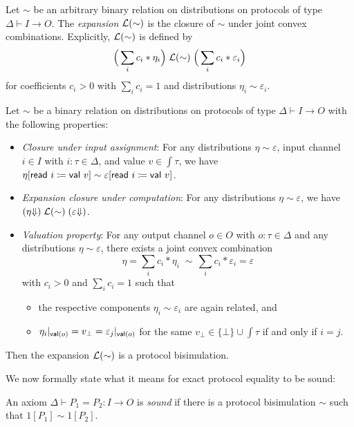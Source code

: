 \begin{definition}
Let $\sim$ be an arbitrary binary relation on distributions on protocols of type $\Delta \vdash I \to O$. The \emph{expansion} $\mathcal{L}(\sim)$ is the closure of $\sim$ under joint convex combinations. Explicitly, $\mathcal{L}(\sim)$ is defined by
\[\Big(\sum_i c_i * \eta_i\Big) \; \mathcal{L}(\sim) \; \Big(\sum_i c_i * \varepsilon_i\Big)\]
for coefficients $c_i > 0$ with $\sum_i c_i = 1$ and distributions $\eta_i \sim \varepsilon_i$.
\end{definition}

\begin{lemma}\label{lem:protocol_seed}
Let $\sim$ be a binary relation on distributions on protocols of type $\Delta \vdash I \to O$ with the following properties:
\begin{itemize}
\item \emph{Closure under input assignment}: For any distributions $\eta \sim \varepsilon$, input channel $i \in I$ with $i : \tau \in \Delta$, and value $v \in \int{\tau}$, we have $\eta[\mathsf{read} \ i \coloneqq \mathsf{val} \ v] \sim \varepsilon[\mathsf{read} \ i \coloneqq \mathsf{val} \ v]$.

\item \emph{Expansion closure under computation}: For any distributions $\eta \sim \varepsilon$, we have $({\eta \hspace{-2.5pt} \Downarrow}) \; \mathcal{L}(\sim) \; ({ \varepsilon \hspace{-2.5pt} \Downarrow})$.

\item \emph{Valuation property}: For any output channel $o \in O$ with $o : \tau \in \Delta$ and any distributions $\eta \sim \varepsilon$, there exists a joint convex combination \[\eta = \sum_i c_i * \eta_i \; \sim \, \sum_i c_i * \varepsilon_i = \varepsilon\]
with $c_i > 0$ and $\sum_i c_i = 1$ such that
\begin{itemize}
\item the respective components $\eta_i \sim \varepsilon_i$ are again related, and
\item $\eta_i|_{\mathsf{val}(o)} = v_\bot = \varepsilon_j|_{\mathsf{val}(o)}$ for the same $v_\bot \in \{\bot\} \cup \int{\tau}$ if and only if $i = j$.
\end{itemize}
\end{itemize}
Then the expansion $\mathcal{L}(\sim)$ is a protocol bisimulation.
\end{lemma}

\noindent We now formally state what it means for exact protocol equality to be sound:

\begin{definition}
An axiom $\Delta \vdash P_1 = P_2 : I \to O$ is \emph{sound} if there is a protocol bisimulation $\sim$ such that $1[P_1] \sim 1[P_2]$.
\end{definition}

